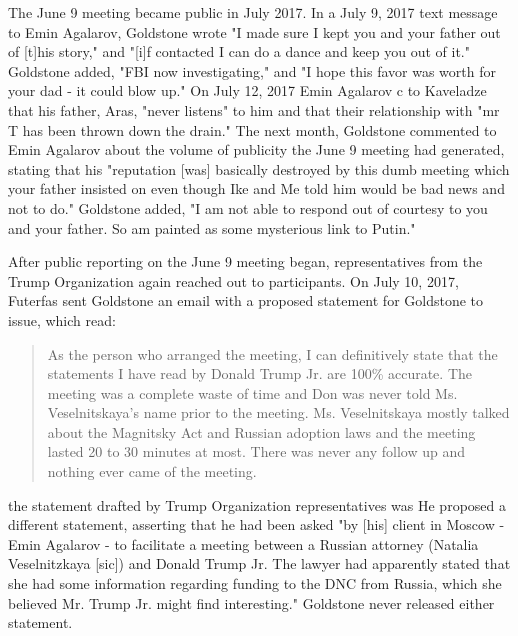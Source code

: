 The June 9 meeting became public in July 2017.
In a July 9, 2017 text message to Emin Agalarov, Goldstone wrote "I made sure I kept you and your father out of [t]his story,"%
and "[i]f contacted I can do a dance and keep you out of it."%
Goldstone added, "FBI now investigating," and "I hope this favor was worth for your dad - it could blow up."%
On July 12, 2017 Emin Agalarov c to Kaveladze that his father, Aras, "never listens" to him and that their relationship with "mr T has been thrown down the drain."%
The next month, Goldstone commented to Emin Agalarov about the volume of publicity the June 9 meeting had generated, stating that his "reputation [was] basically destroyed by this dumb meeting which your father insisted on even though Ike and Me told him would be bad news and not to do."%
Goldstone added, "I am not able to respond out of courtesy to you and your father.
So am painted as some mysterious link to Putin."%

After public reporting on the June 9 meeting began, representatives from the Trump Organization again reached out to participants.
On July 10, 2017, Futerfas sent Goldstone an email with a proposed statement for Goldstone to issue, which read:

\begin{quote}
As the person who arranged the meeting, I can definitively state that the statements I have read by Donald Trump Jr. are 100\% accurate.
The meeting was a complete waste of time and Don was never told Ms. Veselnitskaya's name prior to the meeting.
Ms. Veselnitskaya mostly talked about the Magnitsky Act and Russian adoption laws and the meeting lasted 20 to 30 minutes at most.
There was never any follow up and nothing ever came of the meeting.%
\end{quote}

the statement drafted by Trump Organization representatives was
He proposed a different statement, asserting that he had been asked "by [his] client in Moscow - Emin Agalarov - to facilitate a meeting between a Russian attorney (Natalia Veselnitzkaya [sic]) and Donald Trump Jr.
The lawyer had apparently stated that she had some information regarding funding to the DNC from Russia, which she believed Mr. Trump Jr. might find interesting."%
Goldstone never released either statement.%

